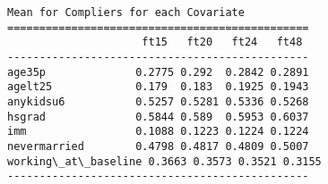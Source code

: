 \documentclass[11pt]{article}
\begin{document}
    \begin{Verbatim}[commandchars=\\\{\}]
     Mean for Compliers for each Covariate     
===============================================
                     ft15   ft20   ft24   ft48 
-----------------------------------------------
age35p              0.2775 0.292  0.2842 0.2891
agelt25             0.179  0.183  0.1925 0.1943
anykidsu6           0.5257 0.5281 0.5336 0.5268
hsgrad              0.5844 0.589  0.5953 0.6037
imm                 0.1088 0.1223 0.1224 0.1224
nevermarried        0.4798 0.4817 0.4809 0.5007
working\_at\_baseline 0.3663 0.3573 0.3521 0.3155
-----------------------------------------------

    \end{Verbatim}


    
    
    
    
\end{document}
